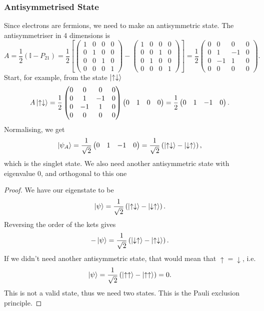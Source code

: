 \documentclass{article}
\begin{document}
\subsubsection{Antisymmetrised State}
Since electrons are fermions, we need to make an antisymmetric state. The antisymmetriser in 4 dimensions is 
\[
    A=\frac{1}{2}\left( \mathbb{I}-P_{21} \right)=\frac{1}{2}\left[\begin{pmatrix}
            1&0&0&0\\0&1&0&0\\0&0&1&0\\0&0&0&1
    \end{pmatrix}-\begin{pmatrix}
            1&0&0&0\\0&0&1&0\\0&1&0&0\\0&0&0&1
    \end{pmatrix} \right]=\frac{1}{2}\begin{pmatrix}
            0&0&0&0\\0&1&-1&0\\0&-1&1&0\\0&0&0&0
    \end{pmatrix}.
\]
Start, for example, from the state $\ket{\uparrow \downarrow}$ 
\[
    A \ket{\uparrow \downarrow}=\frac{1}{2}\begin{pmatrix}
        0&0&0&0\\0&1&-1&0\\0&-1&1&0\\0&0&0&0
    \end{pmatrix}\begin{pmatrix}
        0&1&0&0
    \end{pmatrix}=\frac{1}{2}\begin{pmatrix}
        0&1&-1&0
    \end{pmatrix}.
\]
Normalising, we get 
\[
    \ket{\psi _A}=\frac{1}{\sqrt{2}}\begin{pmatrix}
        0&1&-1&0
    \end{pmatrix}=\frac{1}{\sqrt{2}}\left( \ket{\uparrow \downarrow}-\ket{\downarrow \uparrow} \right),
\]
which is the singlet state. We also need another antisymmetric state with eigenvalue $0$, and orthogonal to this one
\begin{proof}
    We have our eigenstate to be 
    \[
        \ket{\psi }=\frac{1}{\sqrt{2}}\left( \ket{\uparrow \downarrow}-\ket{\downarrow \uparrow} \right).
    \]
    Reversing the order of the kets gives 
    \[
        -\ket{\psi }=\frac{1}{\sqrt{2}}\left( \ket{\downarrow \uparrow}-\ket{\uparrow \downarrow} \right).
    \]
    If we didn't need another antisymmetric state, that would mean that $\uparrow=\downarrow$, i.e. 
    \[
        \ket{\psi }=\frac{1}{\sqrt{2}}\left( \ket{\uparrow \uparrow}-\ket{\uparrow \uparrow} \right)=0.
    \]
    This is not a valid state, thus we need two states. This is the Pauli exclusion principle.
\end{proof}
\end{document}
